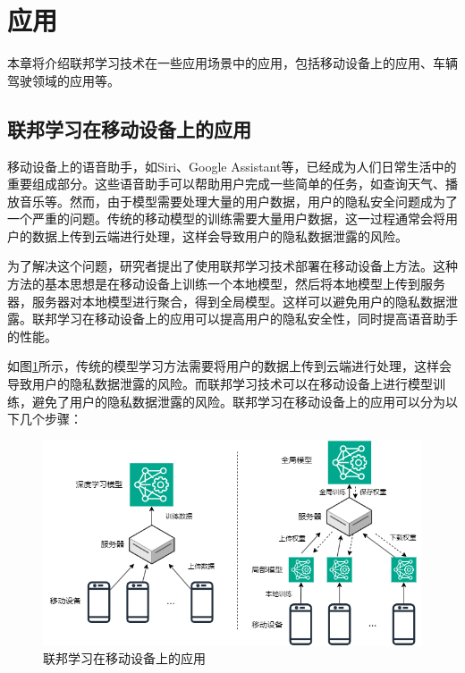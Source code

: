 \section{应用}

本章将介绍联邦学习技术在一些应用场景中的应用，包括移动设备上的应用、车辆驾驶领域的应用等。

\subsection{联邦学习在移动设备上的应用}

移动设备上的语音助手，如Siri、Google Assistant等，已经成为人们日常生活中的重要组成部分。这些语音助手可以帮助用户完成一些简单的任务，如查询天气、播放音乐等。然而，由于模型需要处理大量的用户数据，用户的隐私安全问题成为了一个严重的问题。传统的移动模型的训练需要大量用户数据，这一过程通常会将用户的数据上传到云端进行处理，这样会导致用户的隐私数据泄露的风险。

为了解决这个问题，研究者提出了使用联邦学习技术部署在移动设备上方法\cite{kang2020reliable,lim2020federated}。这种方法的基本思想是在移动设备上训练一个本地模型，然后将本地模型上传到服务器，服务器对本地模型进行聚合，得到全局模型。这样可以避免用户的隐私数据泄露。联邦学习在移动设备上的应用可以提高用户的隐私安全性，同时提高语音助手的性能。

如图\ref{fig:mobile}所示，传统的模型学习方法需要将用户的数据上传到云端进行处理，这样会导致用户的隐私数据泄露的风险。而联邦学习技术可以在移动设备上进行模型训练，避免了用户的隐私数据泄露的风险。联邦学习在移动设备上的应用可以分为以下几个步骤：

\begin{figure}[htbp]
    \centering
    \includegraphics[width=\textwidth]{images/mobile.png}
    \caption{联邦学习在移动设备上的应用}
    \label{fig:mobile}
\end{figure}

